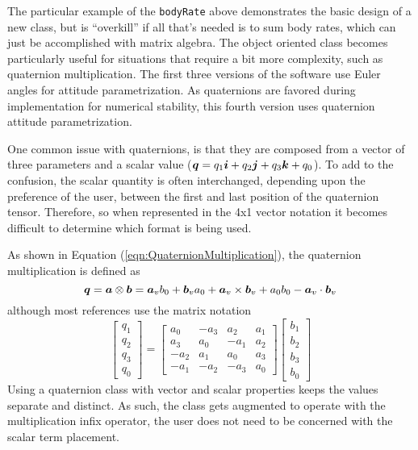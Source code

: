 The particular example of the \verb|bodyRate| above demonstrates the basic design of a new class, but is ``overkill'' if all that's needed is to sum body rates, which can just be accomplished with matrix algebra.  The object oriented class becomes particularly useful for situations that require a bit more complexity, such as quaternion multiplication.  The first three versions of the software use Euler angles for attitude parametrization.  As quaternions are favored during implementation for numerical stability, this fourth version uses quaternion attitude parametrization.

One common issue with quaternions, is that they are composed from a vector of three parameters and a scalar value ($\boldsymbol{q} = q_1 \boldsymbol{i} + q_2 \boldsymbol{j} + q_3 \boldsymbol{k} + q_0$).  To add to the confusion, the scalar quantity is often interchanged, depending upon the preference of the user, between the first and last position of the quaternion tensor.  Therefore, so when represented in the 4x1 vector notation it becomes difficult to determine which format is being used.

As shown in Equation (\ref{eqn:QuaternionMultiplication}), the quaternion multiplication is defined as
\begin{equation}
  \boldsymbol{q} = \boldsymbol{a} \otimes \boldsymbol{b} = \boldsymbol{a}_v b_0 + \boldsymbol{b}_v a_0 + \boldsymbol{a}_v \times \boldsymbol{b}_v + a_0 b_0 - \boldsymbol{a}_v \cdot \boldsymbol{b}_v
\end{equation}
although most references use the matrix notation
\begin{equation}
  \begin{bmatrix} q_1 \\ q_2 \\ q_3 \\ q_0 \end{bmatrix} =
  \begin{bmatrix}
    a_0 & - a_3 &   a_2 & a_1 \\
    a_3 &   a_0 & - a_1 & a_2 \\
  - a_2 &   a_1 &   a_0 & a_3 \\
  - a_1 & - a_2 & - a_3 & a_0
  \end{bmatrix}
  \begin{bmatrix}
  b_1 \\ b_2 \\ b_3 \\ b_0
  \end{bmatrix}
\end{equation}
Using a quaternion class with vector and scalar properties keeps the values separate and distinct.  As such, the class gets augmented to operate with the multiplication infix operator, the user does not need to be concerned with the scalar term placement.

